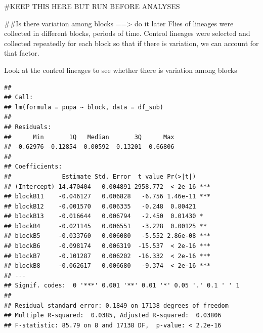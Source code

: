 \documentclass[
]{article}
\newenvironment{Shaded}{\begin{snugshade}}{\end{snugshade}}
\newcommand{\CommentTok}[1]{\textcolor[rgb]{0.56,0.35,0.01}{\textit{#1}}}
\newcommand{\DataTypeTok}[1]{\textcolor[rgb]{0.13,0.29,0.53}{#1}}
\newcommand{\DecValTok}[1]{\textcolor[rgb]{0.00,0.00,0.81}{#1}}
\newcommand{\KeywordTok}[1]{\textcolor[rgb]{0.13,0.29,0.53}{\textbf{#1}}}
\newcommand{\NormalTok}[1]{#1}
\newcommand{\OperatorTok}[1]{\textcolor[rgb]{0.81,0.36,0.00}{\textbf{#1}}}
\begin{document}
\#KEEP THIS HERE BUT RUN BEFORE ANALYSES

\begin{Shaded}
\end{Shaded}

\#\#Is there variation among blocks ==\textgreater{} do it later Flies
of lineages were collected in different blocks, periods of time. Control
lineages were selected and collected repeatedly for each block so that
if there is variation, we can account for that factor.

Look at the control lineages to see whether there is variation among
blocks

\begin{Shaded}
\end{Shaded}

\begin{verbatim}
## 
## Call:
## lm(formula = pupa ~ block, data = df_sub)
## 
## Residuals:
##      Min       1Q   Median       3Q      Max 
## -0.62976 -0.12854  0.00592  0.13201  0.66806 
## 
## Coefficients:
##              Estimate Std. Error  t value Pr(>|t|)    
## (Intercept) 14.470404   0.004891 2958.772  < 2e-16 ***
## blockB11    -0.046127   0.006828   -6.756 1.46e-11 ***
## blockB12    -0.001570   0.006335   -0.248  0.80421    
## blockB13    -0.016644   0.006794   -2.450  0.01430 *  
## blockB4     -0.021145   0.006551   -3.228  0.00125 ** 
## blockB5     -0.033760   0.006080   -5.552 2.86e-08 ***
## blockB6     -0.098174   0.006319  -15.537  < 2e-16 ***
## blockB7     -0.101287   0.006202  -16.332  < 2e-16 ***
## blockB8     -0.062617   0.006680   -9.374  < 2e-16 ***
## ---
## Signif. codes:  0 '***' 0.001 '**' 0.01 '*' 0.05 '.' 0.1 ' ' 1
## 
## Residual standard error: 0.1849 on 17138 degrees of freedom
## Multiple R-squared:  0.0385, Adjusted R-squared:  0.03806 
## F-statistic: 85.79 on 8 and 17138 DF,  p-value: < 2.2e-16
\end{verbatim}
\end{document}
